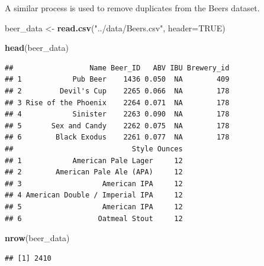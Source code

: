 \documentclass[]{article}
\newenvironment{Shaded}{\begin{snugshade}}{\end{snugshade}}
\newcommand{\KeywordTok}[1]{\textcolor[rgb]{0.13,0.29,0.53}{\textbf{#1}}}
\newcommand{\DataTypeTok}[1]{\textcolor[rgb]{0.13,0.29,0.53}{#1}}
\newcommand{\StringTok}[1]{\textcolor[rgb]{0.31,0.60,0.02}{#1}}
\newcommand{\OtherTok}[1]{\textcolor[rgb]{0.56,0.35,0.01}{#1}}
\newcommand{\NormalTok}[1]{#1}
\begin{document}
A similar process is used to remove duplicates from the Beers dataset.

\begin{Shaded}
\begin{Highlighting}[]
\NormalTok{beer_data <-}\StringTok{ }\KeywordTok{read.csv}\NormalTok{(}\StringTok{"../data/Beers.csv"}\NormalTok{, }\DataTypeTok{header=}\OtherTok{TRUE}\NormalTok{)}

\KeywordTok{head}\NormalTok{(beer_data)}
\end{Highlighting}
\end{Shaded}

\begin{verbatim}
##                  Name Beer_ID   ABV IBU Brewery_id
## 1            Pub Beer    1436 0.050  NA        409
## 2         Devil's Cup    2265 0.066  NA        178
## 3 Rise of the Phoenix    2264 0.071  NA        178
## 4            Sinister    2263 0.090  NA        178
## 5       Sex and Candy    2262 0.075  NA        178
## 6        Black Exodus    2261 0.077  NA        178
##                            Style Ounces
## 1            American Pale Lager     12
## 2        American Pale Ale (APA)     12
## 3                   American IPA     12
## 4 American Double / Imperial IPA     12
## 5                   American IPA     12
## 6                  Oatmeal Stout     12
\end{verbatim}

\begin{Shaded}
\begin{Highlighting}[]
\KeywordTok{nrow}\NormalTok{(beer_data)}
\end{Highlighting}
\end{Shaded}

\begin{verbatim}
## [1] 2410
\end{verbatim}
\end{document}
